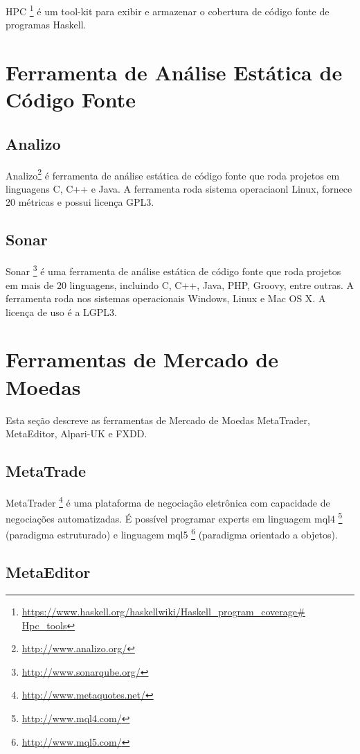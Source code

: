 HPC \footnote{\url{https://www.haskell.org/haskellwiki/Haskell_program_coverage\# Hpc_tools}} é um tool-kit para exibir e armazenar o cobertura de código fonte de programas Haskell.

\section{Ferramenta de Análise Estática de Código Fonte}

\subsection{Analizo}

Analizo\footnote{\url{ http://www.analizo.org/}}  é ferramenta de análise estática de código fonte que roda projetos em linguagens C, C++ e Java. A  ferramenta roda sistema operaciaonl Linux, fornece 20 métricas e possui licença GPL3.

\subsection{Sonar}

Sonar \footnote{\url{ http://www.sonarqube.org/}} é uma ferramenta de análise estática de código fonte que roda projetos em mais de 20 linguagens, incluindo C, C++, Java, PHP, Groovy, entre outras. A ferramenta roda nos sistemas operacionais Windows, Linux e Mac OS X. A licença de uso é a LGPL3.

\section{Ferramentas de Mercado de Moedas}

Esta seção descreve as ferramentas de Mercado de Moedas MetaTrader, MetaEditor, Alpari-UK e FXDD.

\subsection{MetaTrade}

MetaTrader \footnote{\url{http://www.metaquotes.net/}} é uma plataforma de negociação eletrônica com capacidade de negociações automatizadas. É possível programar experts em linguagem mql4 \footnote{\url{http://www.mql4.com/}} (paradigma estruturado)  e linguagem mql5 \footnote{\url{http://www.mql5.com/}} (paradigma orientado a objetos).

\subsection{MetaEditor}

